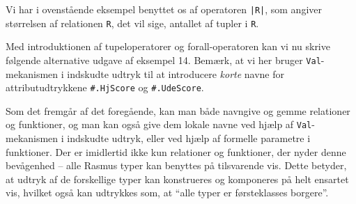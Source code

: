 Vi har i ovenst\aa{}ende eksempel benyttet os af operatoren \verb"|R|",
som angiver st\o{}rrelsen af relationen \verb"R", det vil sige,
antallet af tupler i \verb"R".

Med introduktionen af tupeloperatorer og forall-operatoren kan vi nu
skrive f\o{}lgende alternative udgave af eksempel 14. Bem\ae{}rk, at
vi her bruger \verb"Val"-mekanismen i indskudte udtryk til at
introducere {\em korte\/} navne for attributudtrykkene
\verb"#.HjScore" og \verb"#.UdeScore".

Som det fremg\aa{}r af det foreg\aa{}ende, kan man b\aa{}de navngive
og gemme relationer og funktioner, og man kan ogs\aa{} give
dem lokale navne ved hj\ae{}lp af \verb"Val"-mekanismen i indskudte
udtryk, eller ved hj\ae{}lp af formelle parametre i funktioner.
Der er imidlertid ikke kun relationer og funktioner, der nyder denne
bev\aa{}genhed -- alle {\sc Rasmus} typer kan benyttes p\aa{}
tilsvarende vis. Dette betyder, at udtryk af de forskellige typer
kan konstrueres og komponeres p\aa{} helt ensartet vis, hvilket ogs\aa{}
kan udtrykkes som, at ``alle typer er f\o{}rsteklasses borgere''.

